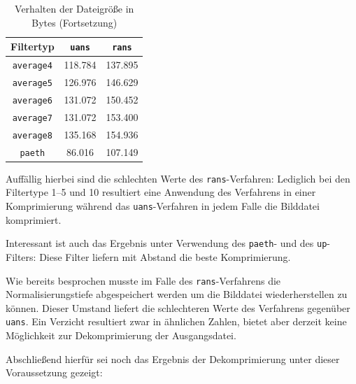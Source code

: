 \documentclass[a4paper,12pt]{article}
\begin{document}
\begin{table}[h]
\begin{center}
\begin{tabular}{c | c | c}
Filtertyp &  {\tt{uans}} & {\tt{rans}}
\\
\hline
{\tt{average4}} & 118.784& 137.895
\\
{\tt{average5}} & 126.976 & 146.629
\\
{\tt{average6}} & 131.072 & 150.452
\\
{\tt{average7}} & 131.072 & 153.400
\\
{\tt{average8}}& 135.168 & 154.936
\\
{\tt{paeth}} & 86.016 & 107.149
\end{tabular}
\caption{Verhalten der Dateigröße in Bytes (Fortsetzung)}
\end{center}
\end{table}
Auffällig hierbei sind die schlechten Werte des {\tt{rans}}-Verfahren: Lediglich bei den Filtertype 1--5 und 10 resultiert eine Anwendung des Verfahrens in einer Komprimierung während das {\tt{uans}}-Verfahren in jedem Falle die Bilddatei komprimiert.
\par
Interessant ist auch das Ergebnis unter Verwendung des {\tt{paeth}}- und des {\tt{up}}-Filters: Diese Filter liefern mit Abstand die beste Komprimierung. 
\par
\vspace{0.5cm}
Wie bereits besprochen musste im Falle des {\tt{rans}}-Verfahrens die Normalisierungstiefe abgespeichert werden um die Bilddatei wiederherstellen zu können. Dieser Umstand liefert die schlechteren Werte des Verfahrens gegenüber {\tt{uans}}. Ein Verzicht resultiert zwar in ähnlichen Zahlen, bietet aber derzeit keine Möglichkeit zur Dekomprimierung der Ausgangsdatei.
\par
\vspace{0.5cm}
Abschließend hierfür sei noch das Ergebnis der Dekomprimierung unter dieser Voraussetzung gezeigt: 
\end{document}
